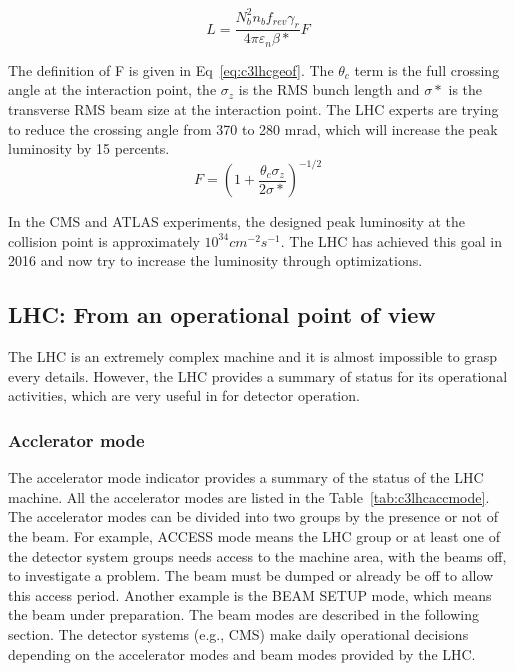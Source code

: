 \begin{equation}
 L = \frac{N^{2}_{b}n_{b}f_{rev}\gamma_{r}}{4\pi \varepsilon_{n}\beta *}F \;
 \label{eq:c3lhclumi}
\end{equation}

The definition of F is given in Eq~\ref{eq:c3lhcgeof}. The $\theta_{c}$ term is the full crossing angle at the interaction point, the $\sigma_{z}$ is the RMS bunch length and $\sigma *$ is the transverse RMS beam size at the interaction point. The LHC experts are trying to reduce the crossing angle from 370 to 280 mrad, which will increase the peak luminosity by 15 percents. 
\begin{equation}
 F = (1+\frac{\theta_{c}\sigma_{z}}{2\sigma *})^{-1/2} \;
 \label{eq:c3lhcgeof}
\end{equation}

In the CMS and ATLAS experiments, the designed peak luminosity at the collision point is approximately $10^{34}cm^{-2}s^{-1}$. The LHC has achieved this goal in 2016 and now try to increase the luminosity through optimizations.

\clearpage
\subsection{LHC: From an operational point of view}

The LHC is an extremely complex machine and it is almost impossible to grasp every details. However, the LHC provides a summary of status for its operational activities, which are very useful in for detector operation.

\subsubsection{Acclerator mode}

The accelerator mode indicator provides a summary of the status of the LHC machine. All the accelerator modes are listed in the Table~\ref{tab:c3lhcaccmode}. The accelerator modes can be divided into two groups by the presence or not of the beam. For example, ACCESS mode means the LHC group or at least one of the detector system groups needs access to the machine area, with the beams off, to investigate a problem. The beam must be dumped or already be off to allow this access period. Another example is the BEAM SETUP mode, which means the beam under preparation. The beam modes are described in the following section. The detector systems (e.g., CMS) make daily operational decisions depending on the accelerator modes and beam modes provided by the LHC.

